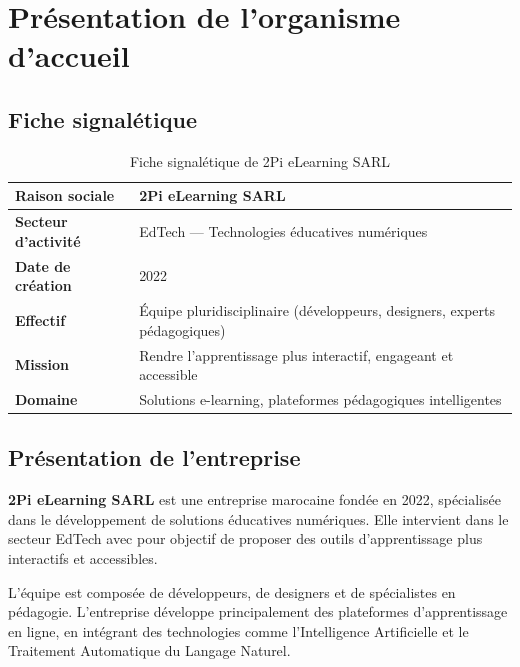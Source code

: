 
\section{Présentation de l'organisme d'accueil}

\subsection{Fiche signalétique}

\begin{table}[H]
\centering
\begin{tabularx}{\textwidth}{lX}
\toprule
\rowcolor{table-row-alt}
\textbf{Raison sociale}      & 2Pi eLearning SARL \\
\midrule
\textbf{Secteur d'activité}  & EdTech — Technologies éducatives numériques \\
\textbf{Date de création}    & 2022 \\
\textbf{Effectif}            & Équipe pluridisciplinaire (développeurs, designers, experts pédagogiques) \\
\textbf{Mission}             & Rendre l'apprentissage plus interactif, engageant et accessible \\
\textbf{Domaine}             & Solutions e-learning, plateformes pédagogiques intelligentes \\
\bottomrule
\end{tabularx}
\caption{Fiche signalétique de 2Pi eLearning SARL}
\label{tab:fiche-entreprise}
\end{table}

\subsection{Présentation de l'entreprise}

\textbf{2Pi eLearning SARL} est une entreprise marocaine fondée en 2022, spécialisée dans le développement de solutions éducatives numériques. Elle intervient dans le secteur EdTech avec pour objectif de proposer des outils d'apprentissage plus interactifs et accessibles.

L'équipe est composée de développeurs, de designers et de spécialistes en pédagogie. L'entreprise développe principalement des plateformes d'apprentissage en ligne, en intégrant des technologies comme l'Intelligence Artificielle et le Traitement Automatique du Langage Naturel.

